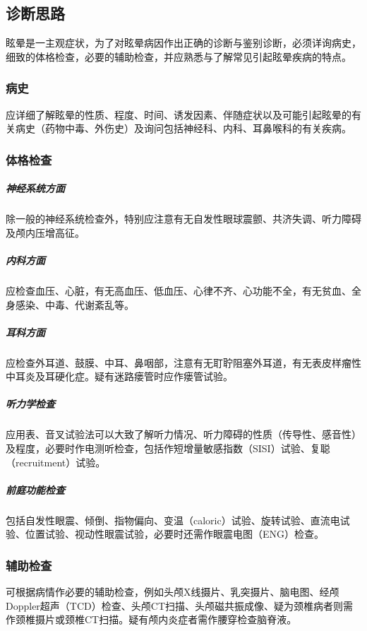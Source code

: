 \subsection{诊断思路}

眩晕是一主观症状，为了对眩晕病因作出正确的诊断与鉴别诊断，必须详询病史，细致的体格检查，必要的辅助检查，并应熟悉与了解常见引起眩晕疾病的特点。

\subsubsection{病史}

应详细了解眩晕的性质、程度、时间、诱发因素、伴随症状以及可能引起眩晕的有关病史（药物中毒、外伤史）及询问包括神经科、内科、耳鼻喉科的有关疾病。

\subsubsection{体格检查}

\subparagraph{神经系统方面}

除一般的神经系统检查外，特别应注意有无自发性眼球震颤、共济失调、听力障碍及颅内压增高征。

\subparagraph{内科方面}

应检查血压、心脏，有无高血压、低血压、心律不齐、心功能不全，有无贫血、全身感染、中毒、代谢紊乱等。

\subparagraph{耳科方面}

应检查外耳道、鼓膜、中耳、鼻咽部，注意有无耵聍阻塞外耳道，有无表皮样瘤性中耳炎及耳硬化症。疑有迷路瘘管时应作瘘管试验。

\subparagraph{听力学检查}

应用表、音叉试验法可以大致了解听力情况、听力障碍的性质（传导性、感音性）及程度，必要时作电测听检查，包括作短增量敏感指数（SISI）试验、复聪（recruitment）试验。

\subparagraph{前庭功能检查}

包括自发性眼震、倾倒、指物偏向、变温（caloric）试验、旋转试验、直流电试验、位置试验、视动性眼震试验，必要时还需作眼震电图（ENG）检查。

\subsubsection{辅助检查}

可根据病情作必要的辅助检查，例如头颅X线摄片、乳突摄片、脑电图、经颅Doppler超声（TCD）检查、头颅CT扫描、头颅磁共振成像、疑为颈椎病者则需作颈椎摄片或颈椎CT扫描。疑有颅内炎症者需作腰穿检查脑脊液。

